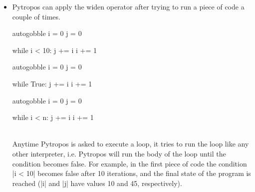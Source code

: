 \begin{itemize}

\item Pytropos can apply the widen operator after trying to run a piece of code a couple
  of times.

\begin{minipage}{.25\textwidth}
    \begin{pythoncode*}{autogobble}
      i = 0
      j = 0

      while i < 10:
          j += i
          i += 1
    \end{pythoncode*}
\end{minipage}\hfill%
\begin{minipage}{.25\textwidth}
    \begin{pythoncode*}{autogobble}
      i = 0
      j = 0

      while True:
          j += i
          i += 1
    \end{pythoncode*}
\end{minipage}\hfill%
\begin{minipage}{.25\textwidth}
    \begin{pythoncode*}{autogobble}
      i = 0
      j = 0

      while i < n:
          j += i
          i += 1
    \end{pythoncode*}
\end{minipage}\\[.4em]

  Anytime Pytropos is asked to execute a loop, it tries to run the loop like any other
  interpreter, i.e. Pytropos will run the body of the loop until the condition becomes
  false. For example, in the first piece of code the condition \pycode|i < 10| becomes
  false after 10 iterations, and the final state of the program is reached (\pycode|i| and
  \pycode|j| have values 10 and 45, respectively).


\end{itemize}
